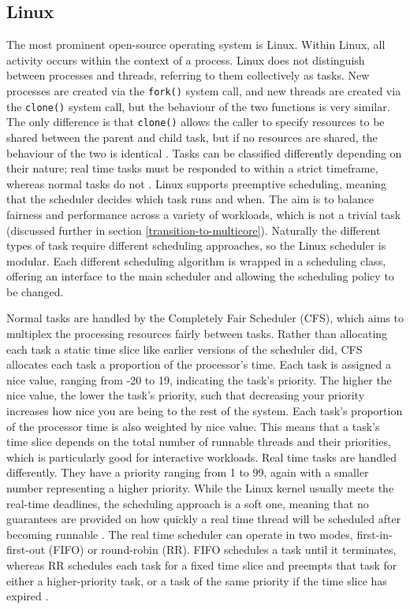\documentclass[bsc,frontabs,singlespacing,parskip,deptreport]{infthesis}     %
\begin{document}
\subsection{Linux}
The most prominent open-source operating system is Linux. Within Linux, all activity occurs within the context of a process. Linux does not distinguish between processes and threads, referring to them collectively as tasks. New processes are created via the \verb|fork()| system call, and new threads are created via the \verb|clone()| system call, but the behaviour of the two functions is very similar. The only difference is that \verb|clone()| allows the caller to specify resources to be shared between the parent and child task, but if no resources are shared, the behaviour of the two is identical \cite{silberschatz}. Tasks can be classified differently depending on their nature; real time tasks must be responded to within a strict timeframe, whereas normal tasks do not \cite{seeker}. Linux supports preemptive scheduling, meaning that the scheduler decides which task runs and when. The aim is to balance fairness and performance across a variety of workloads, which is not a trivial task (discussed further in section \ref{transition-to-multicore}). Naturally the different types of task require different scheduling approaches, so the Linux scheduler is modular. Each different scheduling algorithm is wrapped in a scheduling class, offering an interface to the main scheduler \cite{seeker} and allowing the scheduling policy to be changed. 

Normal tasks are handled by the Completely Fair Scheduler (CFS), which aims to multiplex the processing resources fairly between tasks. Rather than allocating each task a static time slice like earlier versions of the scheduler did, CFS allocates each task a proportion of the processor's time. Each task is assigned a nice value, ranging from -20 to 19, indicating the task's priority. The higher the nice value, the lower the task's priority, such that decreasing your priority increases how nice you are being to the rest of the system. Each task's proportion of the processor time is also weighted by nice value. This means that a task's time slice depends on the total number of runnable threads and their priorities, which is particularly good for interactive workloads. Real time tasks are handled differently. They have a priority ranging from 1 to 99, again with a smaller number representing a higher priority. While the Linux kernel usually meets the real-time deadlines, the scheduling approach is a soft one, meaning that no guarantees are provided on how quickly a real time thread will be scheduled after becoming runnable \cite{silberschatz}. The real time scheduler can operate in two modes, first-in-first-out (FIFO) or round-robin (RR). FIFO schedules a task until it terminates, whereas RR schedules each task for a fixed time slice and preempts that task for either a higher-priority task, or a task of the same priority if the time slice has expired \cite{seeker}.
\end{document}

